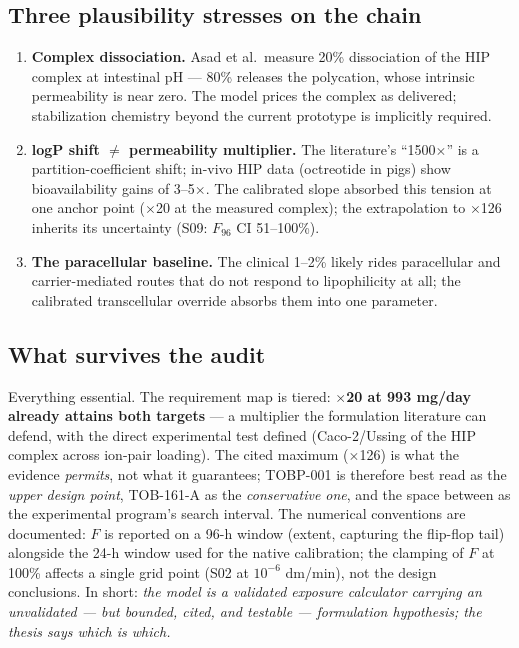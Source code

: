 \subsection{Three plausibility stresses on the chain}
\begin{enumerate}
\item \textbf{Complex dissociation.} Asad et al.\ measure 20\% dissociation of the HIP complex at intestinal pH --- 80\% releases the polycation, whose intrinsic permeability is near zero. The model prices the complex as delivered; stabilization chemistry beyond the current prototype is implicitly required.
\item \textbf{logP shift $\neq$ permeability multiplier.} The literature's ``1500$\times$'' is a partition-coefficient shift; in-vivo HIP data (octreotide in pigs) show bioavailability gains of 3--5$\times$. The calibrated slope absorbed this tension at one anchor point ($\times$20 at the measured complex); the extrapolation to $\times$126 inherits its uncertainty (S09: $F_{96}$ CI 51--100\%).
\item \textbf{The paracellular baseline.} The clinical 1--2\% likely rides paracellular and carrier-mediated routes that do not respond to lipophilicity at all; the calibrated transcellular override absorbs them into one parameter.
\end{enumerate}

\subsection{What survives the audit}
Everything essential. The requirement map is tiered: \textbf{$\times$20 at 993 mg/day already attains both targets} --- a multiplier the formulation literature can defend, with the direct experimental test defined (Caco-2/Ussing of the HIP complex across ion-pair loading). The cited maximum ($\times$126) is what the evidence \emph{permits}, not what it guarantees; TOBP-001 is therefore best read as the \emph{upper design point}, TOB-161-A as the \emph{conservative one}, and the space between as the experimental program's search interval. The numerical conventions are documented: $F$ is reported on a 96-h window (extent, capturing the flip-flop tail) alongside the 24-h window used for the native calibration; the clamping of $F$ at 100\% affects a single grid point (S02 at $10^{-6}$ dm/min), not the design conclusions. In short: \emph{the model is a validated exposure calculator carrying an unvalidated --- but bounded, cited, and testable --- formulation hypothesis; the thesis says which is which.}

